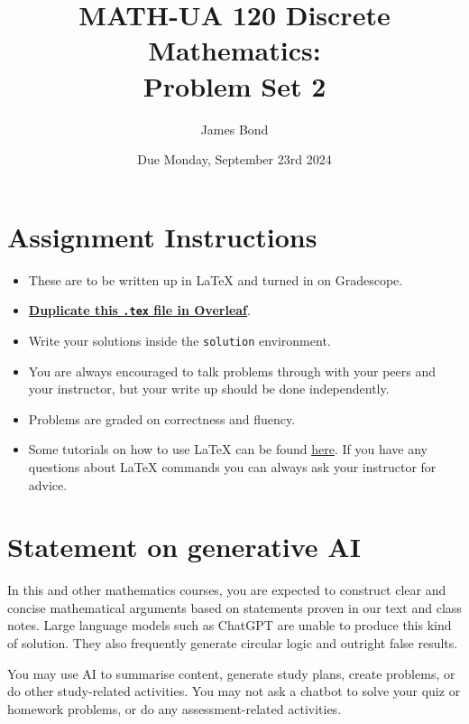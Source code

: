 \documentclass{article}
\title{\textbf{MATH-UA 120 Discrete Mathematics: \\ Problem Set 2}}
\author{%
    James Bond %
}
\date{Due Monday, September 23rd 2024} %
\theoremstyle{definition}
\begin{document}
\maketitle %

\vfill

\section*{Assignment Instructions}

\begin{itemize}
    \item These are to be written up in \LaTeX{} and turned in on Gradescope.
    \item \href{https://bit.ly/3XfKMtA}{\textbf{Duplicate this \texttt{.tex} file in Overleaf}}.
    \item Write your solutions inside the \texttt{solution} environment.
    \item You are always encouraged to talk problems through with your peers and your instructor, but your write up should be done independently.
    \item Problems are graded on correctness and fluency.
    \item Some tutorials on how to use \LaTeX{} can be found \href{https://www.overleaf.com/learn/latex/Tutorials}{\underline{here}}. If you have any questions about \LaTeX{} commands you can always ask your instructor for advice.
\end{itemize}

\vfill

\section*{Statement on generative AI}

In this and other mathematics courses, you are expected to construct clear and concise mathematical arguments based on statements proven in our text and class notes. Large language models such as ChatGPT are unable to produce this kind of solution. They also frequently generate circular logic and outright false results.
 
You may use AI to summarise content, generate study plans, create problems, or do other study-related activities. You may not ask a chatbot to solve your quiz or homework problems, or do any assessment-related activities.
 
\end{document}
